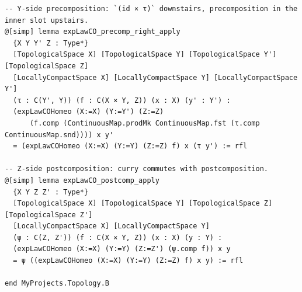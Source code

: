 \documentclass[12pt]{article}
\begin{document}
\begin{lstlisting}
-- Y-side precomposition: `(id × τ)` downstairs, precomposition in the inner slot upstairs.
@[simp] lemma expLawCO_precomp_right_apply
  {X Y Y' Z : Type*}
  [TopologicalSpace X] [TopologicalSpace Y] [TopologicalSpace Y'] [TopologicalSpace Z]
  [LocallyCompactSpace X] [LocallyCompactSpace Y] [LocallyCompactSpace Y']
  (τ : C(Y', Y)) (f : C(X × Y, Z)) (x : X) (y' : Y') :
  (expLawCOHomeo (X:=X) (Y:=Y') (Z:=Z)
      (f.comp (ContinuousMap.prodMk ContinuousMap.fst (τ.comp ContinuousMap.snd)))) x y'
  = (expLawCOHomeo (X:=X) (Y:=Y) (Z:=Z) f) x (τ y') := rfl

-- Z-side postcomposition: curry commutes with postcomposition.
@[simp] lemma expLawCO_postcomp_apply
  {X Y Z Z' : Type*}
  [TopologicalSpace X] [TopologicalSpace Y] [TopologicalSpace Z] [TopologicalSpace Z']
  [LocallyCompactSpace X] [LocallyCompactSpace Y]
  (ψ : C(Z, Z')) (f : C(X × Y, Z)) (x : X) (y : Y) :
  (expLawCOHomeo (X:=X) (Y:=Y) (Z:=Z') (ψ.comp f)) x y
  = ψ ((expLawCOHomeo (X:=X) (Y:=Y) (Z:=Z) f) x y) := rfl

end MyProjects.Topology.B

\end{lstlisting}
\end{document}
